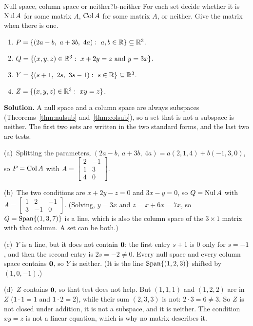 \documentclass[11pt]{article}
\begin{document}
\begin{exmp}{Null space, column space or neither?}{b-neither}
For each set decide whether it is $\operatorname{Nul} A$ for some matrix $A$, $\operatorname{Col} A$ for some matrix $A$, or neither. Give the matrix when there is one.
\begin{enumerate}[label=(\alph*),itemsep=1pt]
  \item $P=\{(2a-b,\ a+3b,\ 4a):\ a,b\in\R\}\subseteq\R^3$.
  \item $Q=\{(x,y,z)\in\mathbb{R}^3:\ x+2y=z\text{ and }y=3x\}$.
  \item $Y=\{(s+1,\ 2s,\ 3s-1):\ s\in\R\}\subseteq\R^3$.
  \item $Z=\{(x,y,z)\in\R^3:\ xy=z\}$.
\end{enumerate}

\textbf{Solution.} A null space and a column space are always subspaces (Theorems~\ref{thm:nulsub} and~\ref{thm:colsub}), so a set that is not a subspace is neither. The first two sets are written in the two standard forms, and the last two are tests.

(a)~Splitting the parameters, $(2a-b,\ a+3b,\ 4a)=a(2,1,4)+b(-1,3,0)$, so $P=\operatorname{Col} A$ with $A=\begin{bmatrix}2&-1\\1&3\\4&0\end{bmatrix}$.

(b)~The two conditions are $x+2y-z=0$ and $3x-y=0$, so $Q=\operatorname{Nul} A$ with $A=\begin{bmatrix}1&2&-1\\3&-1&0\end{bmatrix}$. (Solving, $y=3x$ and $z=x+6x=7x$, so $Q=\operatorname{Span}\{(1,3,7)\}$ is a line, which is also the column space of the $3\times1$ matrix with that column. A set can be both.)

(c)~$Y$ is a line, but it does not contain $\mathbf{0}$: the first entry $s+1$ is $0$ only for $s=-1$, and then the second entry is $2s=-2\neq0$. Every null space and every column space contains $\mathbf{0}$, so $Y$ is neither. (It is the line $\operatorname{Span}\{(1,2,3)\}$ shifted by $(1,0,-1)$.)

(d)~$Z$ contains $\mathbf{0}$, so that test does not help. But $(1,1,1)$ and $(1,2,2)$ are in $Z$ ($1\cdot1=1$ and $1\cdot2=2$), while their sum $(2,3,3)$ is not: $2\cdot3=6\neq3$. So $Z$ is not closed under addition, it is not a subspace, and it is neither. The condition $xy=z$ is not a linear equation, which is why no matrix describes it.
\end{exmp}
\end{document}
